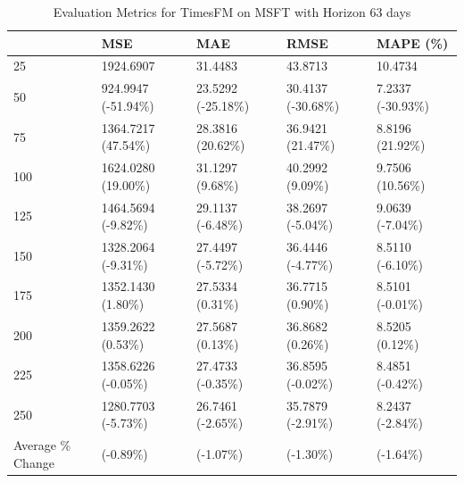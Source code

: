 \begin{table}
\caption{Evaluation Metrics for TimesFM on MSFT with Horizon 63 days}
\label{tab:fm_MSFT_h63_metrics}
\begin{tabular}{lllll}
\toprule
 & MSE & MAE & RMSE & MAPE (\%) \\
\midrule
25 & 1924.6907 & 31.4483 & 43.8713 & 10.4734 \\
50 & 924.9947 (-51.94\%) & 23.5292 (-25.18\%) & 30.4137 (-30.68\%) & 7.2337 (-30.93\%) \\
75 & 1364.7217 (47.54\%) & 28.3816 (20.62\%) & 36.9421 (21.47\%) & 8.8196 (21.92\%) \\
100 & 1624.0280 (19.00\%) & 31.1297 (9.68\%) & 40.2992 (9.09\%) & 9.7506 (10.56\%) \\
125 & 1464.5694 (-9.82\%) & 29.1137 (-6.48\%) & 38.2697 (-5.04\%) & 9.0639 (-7.04\%) \\
150 & 1328.2064 (-9.31\%) & 27.4497 (-5.72\%) & 36.4446 (-4.77\%) & 8.5110 (-6.10\%) \\
175 & 1352.1430 (1.80\%) & 27.5334 (0.31\%) & 36.7715 (0.90\%) & 8.5101 (-0.01\%) \\
200 & 1359.2622 (0.53\%) & 27.5687 (0.13\%) & 36.8682 (0.26\%) & 8.5205 (0.12\%) \\
225 & 1358.6226 (-0.05\%) & 27.4733 (-0.35\%) & 36.8595 (-0.02\%) & 8.4851 (-0.42\%) \\
250 & 1280.7703 (-5.73\%) & 26.7461 (-2.65\%) & 35.7879 (-2.91\%) & 8.2437 (-2.84\%) \\
Average \% Change & (-0.89\%) & (-1.07\%) & (-1.30\%) & (-1.64\%) \\
\bottomrule
\end{tabular}
\end{table}
